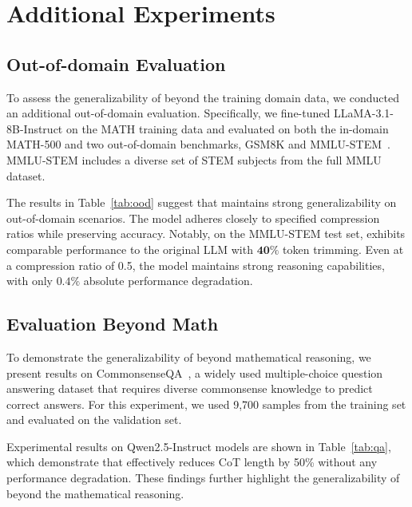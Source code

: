 \section{Additional Experiments}
\label{appendix:exp}

\subsection{Out-of-domain Evaluation}
\label{appendix:ood}
To assess the generalizability of \method beyond the training domain data, we conducted an additional out-of-domain evaluation. Specifically, we fine-tuned LLaMA-3.1-8B-Instruct on the MATH training data and evaluated \method on both the in-domain MATH-500 and two out-of-domain benchmarks, GSM8K and MMLU-STEM~\cite{hendrycks2021mmlu}. MMLU-STEM includes a diverse set of STEM subjects from the full MMLU dataset.

The results in Table~\ref{tab:ood} suggest that \method maintains strong generalizability on out-of-domain scenarios. The model adheres closely to specified compression ratios while preserving accuracy. Notably, on the MMLU-STEM test set, \method exhibits comparable performance to the original LLM with $\bm{40\%}$ token trimming. Even at a compression ratio of 0.5, the model maintains strong reasoning capabilities, with only $0.4\%$ absolute performance degradation.



\subsection{Evaluation Beyond Math}
\label{appendix:eval-qa}
To demonstrate the generalizability of \method beyond mathematical reasoning, we present results on CommonsenseQA~\cite{commonsenseqa}, a widely used multiple-choice question answering dataset that requires diverse commonsense knowledge to predict correct answers. For this experiment, we used 9,700 samples from the training set and evaluated \method on the validation set.



Experimental results on Qwen2.5-Instruct models are shown in Table~\ref{tab:qa}, which demonstrate that \method effectively reduces CoT length by 50\% without any performance degradation. These findings further highlight the generalizability of \method beyond the mathematical reasoning.